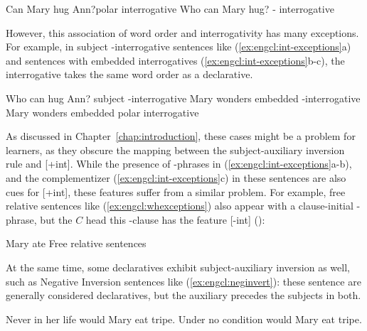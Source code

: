\bxl{}
Can Mary hug Ann?\hfill polar interrogative
\ex
Who can Mary hug? \hfill \twh-
interrogative
\exl
\eex


However, this association of word order and interrogativity has many exceptions. For example, in subject \twh-interrogative sentences like (\ref{ex:engcl:int-exceptions}a) and sentences with embedded interrogatives (\ref{ex:engcl:int-exceptions}b-c), the interrogative takes the same word order as a declarative. 

\bxl{}
Who can hug Ann? \hfill subject \twh-interrogative
\ex
Mary wonders  \hfill embedded \twh-interrogative
\ex 
Mary wonders  \hfill embedded polar interrogative
\exl
\eex

As discussed in Chapter~\ref{chap:introduction}, these cases might be a problem for learners, as they obscure the mapping between the subject-auxiliary inversion rule and [+int]. While the presence of \twh-phrases in (\ref{ex:engcl:int-exceptions}a-b), and the complementizer  (\ref{ex:engcl:int-exceptions}c) in these sentences are also cues for [+int], these features suffer from a similar problem. For example, free relative sentences like (\ref{ex:engcl:whexceptions}) also appear with a clause-initial \twh-phrase, but the $C$ head this \twh-clause has the feature [-int] (\cite{bresnan1978free, caponigro2003free}):

Mary ate  \hfill Free relative sentences
\eex


At the same time, some declaratives exhibit subject-auxiliary inversion as well, such as Negative Inversion sentences like (\ref{ex:engcl:neginvert}): these sentence are generally considered declaratives, but the auxiliary  precedes the subjects in both.

\bxl{}
Never in her life would Mary eat tripe.
\ex
Under no condition would Mary eat tripe.
\exl
\eex

